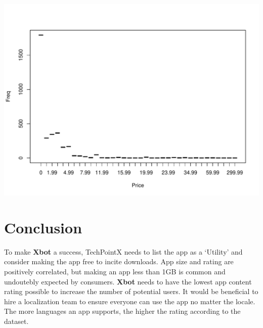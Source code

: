 \documentclass[]{article}
\begin{document}
\begin{center}\includegraphics{Plots/analysis7-1} \end{center}

\section{Conclusion}\label{conclusion}

To make \textbf{Xbot} a success, TechPointX needs to list the app as a
`Utility' and consider making the app free to incite downloads. App size
and rating are positively correlated, but making an app less than 1GB is
common and undoutebly expected by consumers. \textbf{Xbot} needs to have
the lowest app content rating possible to increase the number of
potential users. It would be beneficial to hire a localization team to
ensure everyone can use the app no matter the locale. The more languages
an app supports, the higher the rating according to the dataset.
\end{document}
